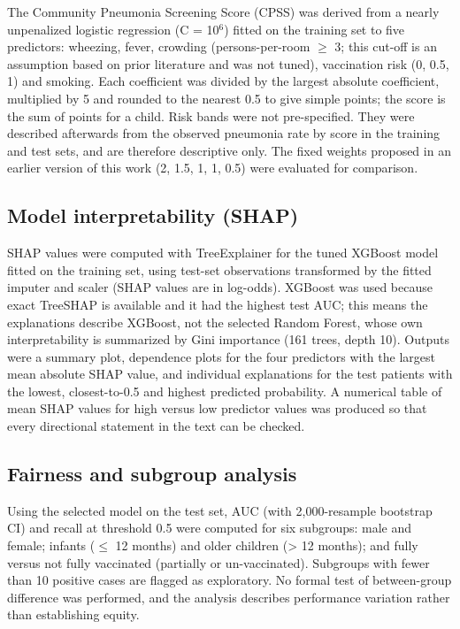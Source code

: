 \documentclass[a4paper,fleqn]{cas-dc}
\begin{document}
The Community Pneumonia Screening Score (CPSS) was derived from a nearly unpenalized logistic regression (C = 10$^{6}$) fitted on the training set to five predictors: wheezing, fever, crowding (persons-per-room $\geq$ 3; this cut-off is an assumption based on prior literature \cite{r3} and was not tuned), vaccination risk (0, 0.5, 1) and smoking. Each coefficient was divided by the largest absolute coefficient, multiplied by 5 and rounded to the nearest 0.5 to give simple points; the score is the sum of points for a child. Risk bands were not pre-specified. They were described afterwards from the observed pneumonia rate by score in the training and test sets, and are therefore descriptive only. The fixed weights proposed in an earlier version of this work (2, 1.5, 1, 1, 0.5) were evaluated for comparison.

\subsection{Model interpretability (SHAP)}

SHAP values \cite{r24} were computed with TreeExplainer for the tuned XGBoost model fitted on the training set, using test-set observations transformed by the fitted imputer and scaler (SHAP values are in log-odds). XGBoost was used because exact TreeSHAP is available and it had the highest test AUC; this means the explanations describe XGBoost, not the selected Random Forest, whose own interpretability is summarized by Gini importance (161 trees, depth 10). Outputs were a summary plot, dependence plots for the four predictors with the largest mean absolute SHAP value, and individual explanations for the test patients with the lowest, closest-to-0.5 and highest predicted probability. A numerical table of mean SHAP values for high versus low predictor values was produced so that every directional statement in the text can be checked.

\subsection{Fairness and subgroup analysis}
\label{sec:fairm}

Using the selected model on the test set, AUC (with 2,000-resample bootstrap CI) and recall at threshold 0.5 were computed for six subgroups: male and female; infants ($\leq$ 12 months) and older children (> 12 months); and fully versus not fully vaccinated (partially or un-vaccinated). Subgroups with fewer than 10 positive cases are flagged as exploratory. No formal test of between-group difference was performed, and the analysis describes performance variation rather than establishing equity.
\end{document}
